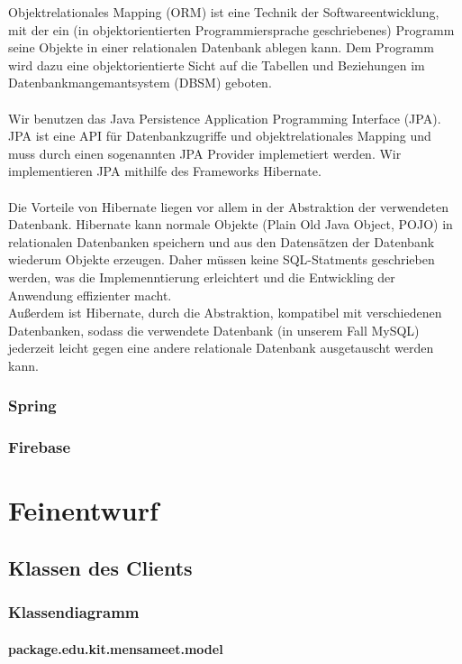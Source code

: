 \documentclass[a4paper]{scrreprt}
\begin{document}
Objektrelationales Mapping (ORM) ist eine Technik der Softwareentwicklung, mit der ein (in objektorientierten Programmiersprache geschriebenes) Programm seine Objekte in einer relationalen Datenbank ablegen kann. Dem Programm wird dazu eine objektorientierte Sicht auf die Tabellen und Beziehungen im Datenbankmangemantsystem (DBSM) geboten. \\  \\ Wir benutzen das Java Persistence Application Programming Interface (JPA). \\ JPA ist eine API für Datenbankzugriffe und objektrelationales Mapping und muss durch einen sogenannten JPA Provider implemetiert werden. Wir implementieren JPA mithilfe des Frameworks Hibernate.\\ \\ Die Vorteile von Hibernate liegen vor allem in der Abstraktion der verwendeten Datenbank. Hibernate kann normale Objekte (Plain Old Java Object, POJO) in relationalen Datenbanken speichern und aus den Datensätzen der Datenbank wiederum Objekte erzeugen. Daher müssen keine SQL-Statments geschrieben werden, was die Implemenntierung erleichtert und die Entwickling der Anwendung effizienter macht. \\  Außerdem ist Hibernate, durch die Abstraktion, kompatibel mit verschiedenen Datenbanken, sodass die verwendete Datenbank (in unserem Fall MySQL) jederzeit leicht gegen eine andere relationale Datenbank ausgetauscht werden kann.

\subsection*{Spring}
\subsection*{Firebase}

\chapter{Feinentwurf}
\section{Klassen des Clients}
\subsection{Klassendiagramm}
\subsubsection{package.edu.kit.mensameet.model}
\end{document}
